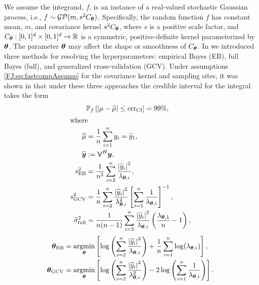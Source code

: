 \documentclass[graybox,footinfo]{svmult}
\newcommand{\abs}[1]{\left\lvert #1 \right\rvert} %
\begin{document}
We assume the integrand, $f$, is an instance of a real-valued stochastic Gaussian process, i.e., $f \sim \mathcal{GP}(m,s^2 C_{\boldsymbol{\theta}})$.  Specifically, the random function $f$ has constant mean, $m$, and covariance kernel $s^2C_{\boldsymbol{\theta}}$, where $s$ is a positive scale factor, and $C_{\boldsymbol{\theta}}: [0,1]^d \times [0,1]^d \to \mathbb{R} $ is a symmetric, positive-definite kernel parameterized by ${\boldsymbol{\theta}}$.  The parameter ${\boldsymbol{\theta}}$ may affect the shape or smoothness of $C_{\boldsymbol{\theta}}$.  In \cite{RatHic19a} we introduced three methods for resolving the hyperparameters:  empirical Bayes (EB), full Bayes (full), and generalized cross-validation (GCV).  Under assumptions \eqref{FJ:eq:fastcompAssump} for the covariance kernel and sampling sites, it was shown in \cite[Theorem 2]{RatHic19a} that under these three approaches the credible interval for the integral takes the form
		\begin{align}
			\label{FJ:eqn:CI}
			&\mathbb{P}_f \left[
			|\mu-\widehat{\mu}| \leq \textup{err}_{\textup{CI}}
			\right] = 99\%, \\
			\intertext{where}
			\label{FJ:muhatGCV-FB-MLE-Simple}
			\widehat{\mu} &= \frac 1n \sum_{i=1}^n y_i = \widetilde{y}_1, \\
		\nonumber 
		\widetilde{\bsy} &:= \mathsf{V}^H \bsy, \\
		\nonumber
		s^2_\textup{EB} 
		& =
		\frac{1}{n^2} 
		\sum_{i=2}^n \frac{\abs{\widetilde{y}_i}^2}{\lambda_{\bstheta,i}},  \\
		\nonumber 
		s^2_{\textup{GCV}} & =  \frac 1{n} \sum_{i=2}^n \frac{\abs{\widetilde{y}_i}^2}{\lambda_{\bstheta,i}^2}  \left [ \sum_{i=1}^n \frac{1}{\lambda_{\bstheta,i}} \right]^{-1}, \\
		\nonumber
		\widehat{\sigma}^2_{\textup{full}} &= \frac{1}{n(n-1)} \sum_{i=2}^n \frac{\abs{\widetilde{y}_i}^2}{\lambda_{\bstheta,i}}  \left(\frac{\lambda_{\bstheta,1}}{n}  - 1  \right), 
		\end{align}
	\begin{subequations}
		\label{FJ:eqn:fastTheta}
		\begin{align}
		\label{FJ:eqn:fastThetaEB}
		\bstheta_\textup{EB}
		&= 
		\argmin_{\bstheta}
		\left[
		\log\left(
		\sum_{i=2}^n \frac{\abs{\widetilde{y}_i}^2}{\lambda_{\bstheta,i}}
		\right) 
		+ \frac{1}{n}\sum_{i=1}^n \log(\lambda_{\bstheta,i})
		\right],\\
		\label{FJ:eqn:fastThetaGCV} 
		\bstheta_{\textup{GCV}} 
		&= \argmin_\bstheta \left[ \log \left ( \sum_{i=2}^n \frac{\abs{\widetilde{y}_i}^2}{\lambda_{\bstheta,i}^2} 
		\right)  
		-2\log\left( \sum_{i=1}^n \frac{1}{\lambda_{\bstheta,i}} \right)
		\right].
		\end{align}
	\end{subequations}
\end{document}
